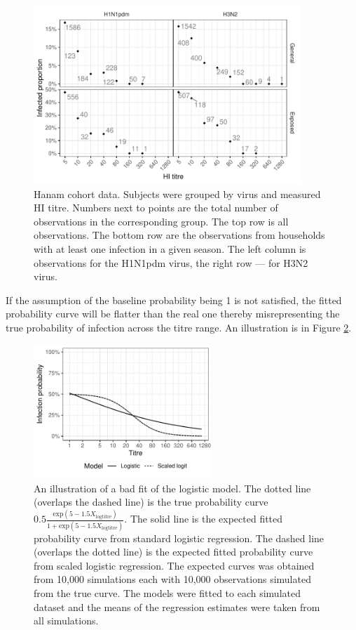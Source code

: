 \documentclass[12pt]{article}
\begin{document}
\begin{figure}[htp]
	\centering
	\includegraphics[width=0.9\textwidth]{../data-plot/hanam-hi-summ-light.pdf}
	\caption{
	Hanam cohort data. Subjects were grouped by virus and measured HI titre. Numbers next to points are the total number of observations in the corresponding group. The top row is all observations. The bottom row are the observations from households with at least one infection in a given season. The left column is observations for the H1N1pdm virus, the right row --- for H3N2 virus.
	}
	\label{HanamCounts}
\end{figure}

If the assumption of the baseline probability being 1 is not satisfied, the fitted probability curve will be flatter than the real one thereby misrepresenting the true probability of infection across the titre range. An illustration is in Figure \ref{LogisticFit}.

\pagebreak

\begin{figure}[htp]
	\centering
	\includegraphics[width=0.6\textwidth]{../logistic-plot/lrex.pdf}
	\caption{
	An illustration of a bad fit of the logistic model. The dotted line (overlaps the dashed line) is the true probability curve $0.5\frac{\text{exp}(5 - 1.5 X_{\text{logtitre}})}{1 + \text{exp}(5 - 1.5 X_{\text{logtitre}})}$. The solid line is the expected fitted probability curve from standard logistic regression. The dashed line (overlaps the dotted line) is the expected fitted probability curve from scaled logistic regression. The expected curves was obtained from 10,000 simulations each with 10,000 observations simulated from the true curve. The models were fitted to each simulated dataset and the means of the regression estimates were taken from all simulations.
	}
	\label{LogisticFit}
\end{figure}
\end{document}
